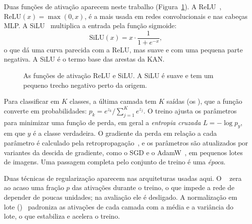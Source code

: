 Duas funções de ativação aparecem neste trabalho (Figura~\ref{fig:ativacoes}). A \gls{ReLU}~\cite{nair2010rectified}, $\mathrm{ReLU}(x) = \max(0, x)$, é a mais usada em redes convolucionais e nas cabeças MLP. A \gls{SiLU}~\cite{elfwing2018sigmoid} multiplica a entrada pela função sigmoide:
\begin{equation}
\mathrm{SiLU}(x) = x \cdot \frac{1}{1 + e^{-x}},
\label{eq:silu}
\end{equation}
o que dá uma curva parecida com a ReLU, mas suave e com uma pequena parte negativa. A SiLU é o termo base das arestas da KAN.

\begin{figure}[htpb]
\centering
{}
\caption{As funções de ativação ReLU e SiLU. A SiLU é suave e tem um pequeno trecho negativo perto da origem.}
\label{fig:ativacoes}
\end{figure}

Para classificar em $K$ classes, a última camada tem $K$ saídas (os ), que a função  converte em probabilidades: $p_k = e^{z_k} / \sum_{j=1}^{K} e^{z_j}$. O treino ajusta os parâmetros para minimizar uma função de perda, em geral a \emph{entropia cruzada} $L = -\log p_{y}$, em que $y$ é a classe verdadeira. O gradiente da perda em relação a cada parâmetro é calculado pela retropropagação~\cite{rumelhart1986learning}, e os parâmetros são atualizados por variantes da descida de gradiente, como o \gls{SGD} e o AdamW~\cite{loshchilov2019adamw}, em pequenos lotes de imagens. Uma passagem completa pelo conjunto de treino é uma \emph{época}.

Duas técnicas de regularização aparecem nas arquiteturas usadas aqui. O ~\cite{srivastava2014dropout} zera ao acaso uma fração $p$ das ativações durante o treino, o que impede a rede de depender de poucas unidades; na avaliação ele é desligado. A normalização em lote ()~\cite{ioffe2015batch} padroniza as ativações de cada camada com a média e a variância do lote, o que estabiliza e acelera o treino.

